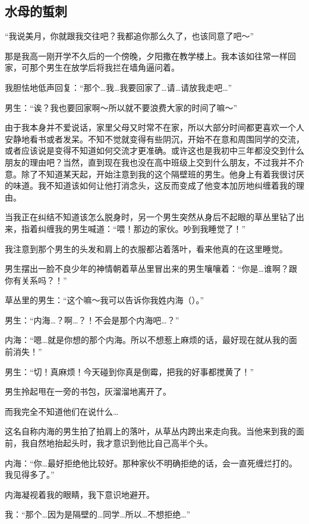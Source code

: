 \newpage
\newday{{\sunset}}
\subsection{水母的蜇刺}



“我说美月，你就跟我交往吧？我都追你那么久了，也该同意了吧～”

那是我高一刚开学不久后的一个傍晚，夕阳撒在教学楼上。我本该如往常一样回家，可那个男生在放学后将我拦在墙角逼问着。

我胆怯地低声回复：“那个…我…我要回家了…请…请放我走吧…”

男生：“诶？我也要回家啊～所以就不要浪费大家的时间了嘛～”

由于我本身并不爱说话，家里父母又时常不在家，所以大部分时间都更喜欢一个人安静地看书或者发呆。不知不觉就变得有些阴沉，开始不在意和周围同学的交流，或者应该说是变得不知道如何交流才更准确。或许这也是我初中三年都没交到什么朋友的理由吧？当然，直到现在我也没在高中班级上交到什么朋友，不过我并不介意。除了不知道某天起，开始注意到我的这个隔壁班的男生。他身上有着我很讨厌的味道。我不知道该如何让他打消念头，这反而变成了他变本加厉地纠缠着我的理由。

当我正在纠结不知道该怎么脱身时，另一个男生突然从身后不起眼的草丛里钻了出来，指着纠缠我的男生喊道：“喂！那边的家伙。吵到我睡觉了！”

我注意到那个男生的头发和肩上的衣服都沾着落叶，看来他真的在这里睡觉。

男生摆出一脸不良少年的神情朝着草丛里冒出来的男生嚷嚷着：“你是…谁啊？跟你有关系吗？！”

草丛里的男生：“这个嘛～我可以告诉你我姓内海（）。”

男生：“内海…？啊…？！不会是那个内海吧…？”

内海：“嗯…就是你想的那个内海。所以不想惹上麻烦的话，最好现在就从我的面前消失！”

男生：“切！真麻烦！今天碰到你真是倒霉，把我的好事都搅黄了！”

男生拎起甩在一旁的书包，灰溜溜地离开了。

而我完全不知道他们在说什么…

这名自称内海的男生拍了拍肩上的落叶，从草丛内跨出来走向我。当他来到我的面前，我自然地抬起头时，我才意识到他比自己高半个头。

内海：“你…最好拒绝他比较好。那种家伙不明确拒绝的话，会一直死缠烂打的。我见得多了。”

内海凝视着我的眼睛，我下意识地避开。

我：“那个…因为是隔壁的…同学…所以…不想拒绝…”

